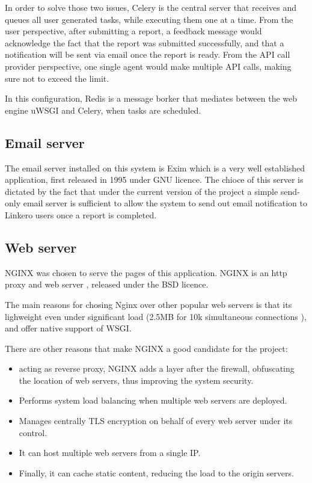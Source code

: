 In order to solve those two issues, Celery is the central server that receives
and queues all user generated tasks, while executing them one at a time. From
the user perspective, after submitting a report, a feedback message would
acknowledge the fact that the report was submitted successfully, and that a
notification will be sent via email once the report is ready. From the API call
provider perspective, one single agent would make multiple API calls, making
sure not to exceed the limit.

In this configuration, Redis is a message borker that mediates between the web
engine uWSGI and Celery, when tasks are scheduled.

\subsection{Email server}
The email server installed on this system is Exim \cite{exim} which is a very
well established application, first released in 1995 under GNU licence. The
chioce of this server is dictated by the fact that under the current version of
the project a simple send-only email server is sufficient to allow the system to
send out email notification to Linkero users once a report is completed.

\subsection{Web server}
NGINX was chosen to serve the pages of this application. NGINX is an http proxy
and web server \cite{Nginx}, released under the BSD licence.

The main reasons for chosing Nginx over other popular web servers is that its
lighweight even under significant load (2.5MB for 10k simultaneous connections
\cite{wkngx}), and offer native support of WSGI.

There are other reasons that make NGINX a good candidate for the project:
\begin{itemize}
  \item acting as reverse proxy, NGINX adds a layer after the firewall,
  obfuscating the location of web servers, thus improving the system security.
  \item Performs system load balancing when multiple web servers are deployed.
  \item Manages centrally TLS encryption on behalf of every web server under its
  control.
  \item It can host multiple web servers from a single IP.
  \item Finally, it can cache static content, reducing the load to the origin
  servers.
\end{itemize}

